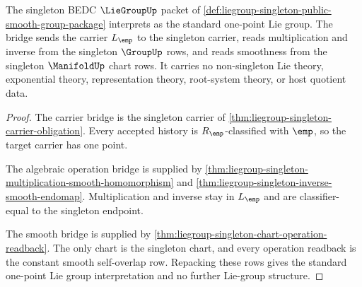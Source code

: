 \begin{theorem}
\label{thm:liegroup-singleton-standard-bridge}
The singleton BEDC $\LieGroupUp$ packet of
\autoref{def:liegroup-singleton-public-smooth-group-package} interprets as the
standard one-point Lie group. The bridge sends the carrier $L_{\emp}$ to the
singleton carrier, reads multiplication and inverse from the singleton
$\GroupUp$ rows, and reads smoothness from the singleton $\ManifoldUp$ chart
rows. It carries no non-singleton Lie theory, exponential theory,
representation theory, root-system theory, or host quotient data.
\end{theorem}
\begin{proof}
The carrier bridge is the singleton carrier of
\autoref{thm:liegroup-singleton-carrier-obligation}. Every accepted history is
$R_{\emp}$-classified with $\emp$, so the target carrier has one point.

The algebraic operation bridge is supplied by
\autoref{thm:liegroup-singleton-multiplication-smooth-homomorphism} and
\autoref{thm:liegroup-singleton-inverse-smooth-endomap}. Multiplication and
inverse stay in $L_{\emp}$ and are classifier-equal to the singleton endpoint.

The smooth bridge is supplied by
\autoref{thm:liegroup-singleton-chart-operation-readback}. The only chart is
the singleton chart, and every operation readback is the constant smooth
self-overlap row. Repacking these rows gives the standard one-point Lie group
interpretation and no further Lie-group structure.
\end{proof}
